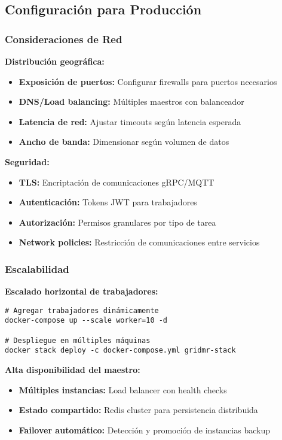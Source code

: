 \subsection{Configuración para Producción}

\subsubsection{Consideraciones de Red}

\textbf{Distribución geográfica:}
\begin{itemize}
    \item \textbf{Exposición de puertos:} Configurar firewalls para puertos necesarios
    \item \textbf{DNS/Load balancing:} Múltiples maestros con balanceador
    \item \textbf{Latencia de red:} Ajustar timeouts según latencia esperada
    \item \textbf{Ancho de banda:} Dimensionar según volumen de datos
\end{itemize}

\textbf{Seguridad:}
\begin{itemize}
    \item \textbf{TLS:} Encriptación de comunicaciones gRPC/MQTT
    \item \textbf{Autenticación:} Tokens JWT para trabajadores
    \item \textbf{Autorización:} Permisos granulares por tipo de tarea
    \item \textbf{Network policies:} Restricción de comunicaciones entre servicios
\end{itemize}

\subsubsection{Escalabilidad}

\textbf{Escalado horizontal de trabajadores:}
\begin{verbatim}
# Agregar trabajadores dinámicamente
docker-compose up --scale worker=10 -d

# Despliegue en múltiples máquinas
docker stack deploy -c docker-compose.yml gridmr-stack
\end{verbatim}

\textbf{Alta disponibilidad del maestro:}
\begin{itemize}
    \item \textbf{Múltiples instancias:} Load balancer con health checks
    \item \textbf{Estado compartido:} Redis cluster para persistencia distribuida
    \item \textbf{Failover automático:} Detección y promoción de instancias backup
\end{itemize}

